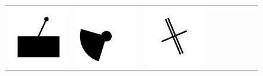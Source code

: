 \documentclass[doc]{apa6}
\newcommand{\stimulusscale}{.1}
\begin{document}
\begin{figure}[p]
\begin{center}
\begin{tabular}{c|cccccccc}
\includegraphics[scale=\stimulusscale]{./set9stim75.png} &
\includegraphics[scale=\stimulusscale]{./set10stim75.png} &
\includegraphics[scale=\stimulusscale]{./set11stim75.png} &

\end{tabular}
\end{center}
\end{figure}
\end{document}
